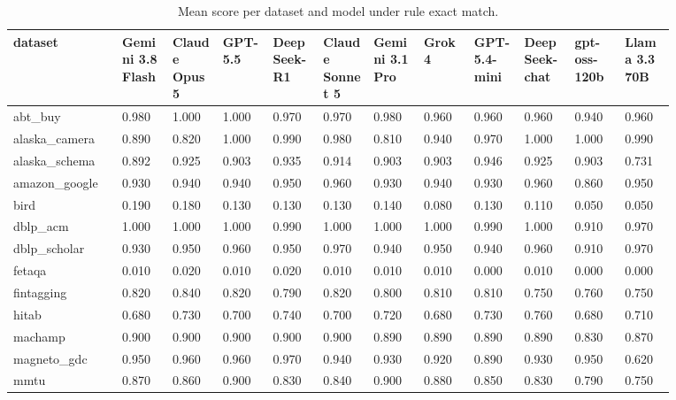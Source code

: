 \begin{landscape}
\tiny
\setlength{\tabcolsep}{3pt}
\begin{longtable}{p{0.134\linewidth}p{0.067\linewidth}p{0.067\linewidth}p{0.067\linewidth}p{0.067\linewidth}p{0.067\linewidth}p{0.067\linewidth}p{0.067\linewidth}p{0.067\linewidth}p{0.067\linewidth}p{0.067\linewidth}p{0.067\linewidth}}
\caption{Mean score per dataset and model under rule exact match.}\label{tab:per_dataset_mean_em_only}\\
\toprule
dataset & Gemini 3.8 Flash & Claude Opus 5 & GPT-5.5 & DeepSeek-R1 & Claude Sonnet 5 & Gemini 3.1 Pro & Grok 4 & GPT-5.4-mini & DeepSeek-chat & gpt-oss-120b & Llama 3.3 70B \\
\midrule
abt\_\allowbreak{}buy & 0.980 & 1.000 & 1.000 & 0.970 & 0.970 & 0.980 & 0.960 & 0.960 & 0.960 & 0.940 & 0.960 \\
alaska\_\allowbreak{}camera & 0.890 & 0.820 & 1.000 & 0.990 & 0.980 & 0.810 & 0.940 & 0.970 & 1.000 & 1.000 & 0.990 \\
alaska\_\allowbreak{}schema & 0.892 & 0.925 & 0.903 & 0.935 & 0.914 & 0.903 & 0.903 & 0.946 & 0.925 & 0.903 & 0.731 \\
amazon\_\allowbreak{}google & 0.930 & 0.940 & 0.940 & 0.950 & 0.960 & 0.930 & 0.940 & 0.930 & 0.960 & 0.860 & 0.950 \\
bird & 0.190 & 0.180 & 0.130 & 0.130 & 0.130 & 0.140 & 0.080 & 0.130 & 0.110 & 0.050 & 0.050 \\
dblp\_\allowbreak{}acm & 1.000 & 1.000 & 1.000 & 0.990 & 1.000 & 1.000 & 1.000 & 0.990 & 1.000 & 0.910 & 0.970 \\
dblp\_\allowbreak{}scholar & 0.930 & 0.950 & 0.960 & 0.950 & 0.970 & 0.940 & 0.950 & 0.940 & 0.960 & 0.910 & 0.970 \\
fetaqa & 0.010 & 0.020 & 0.010 & 0.020 & 0.010 & 0.010 & 0.010 & 0.000 & 0.010 & 0.000 & 0.000 \\
fintagging & 0.820 & 0.840 & 0.820 & 0.790 & 0.820 & 0.800 & 0.810 & 0.810 & 0.750 & 0.760 & 0.750 \\
hitab & 0.680 & 0.730 & 0.700 & 0.740 & 0.700 & 0.720 & 0.680 & 0.730 & 0.760 & 0.680 & 0.710 \\
machamp & 0.900 & 0.900 & 0.900 & 0.900 & 0.900 & 0.890 & 0.890 & 0.890 & 0.890 & 0.830 & 0.870 \\
magneto\_\allowbreak{}gdc & 0.950 & 0.960 & 0.960 & 0.970 & 0.940 & 0.930 & 0.920 & 0.890 & 0.930 & 0.950 & 0.620 \\
mmtu & 0.870 & 0.860 & 0.900 & 0.830 & 0.840 & 0.900 & 0.880 & 0.850 & 0.830 & 0.790 & 0.750 \\

\end{longtable}
\end{landscape}
